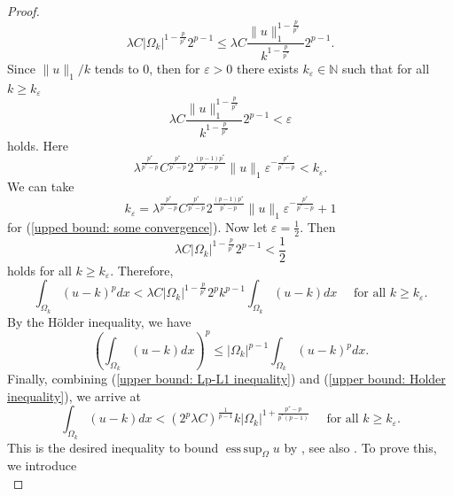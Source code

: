 \documentclass[a4paper,12pt,reqno]{amsart}
\renewcommand\eqref[1]{(\ref{#1})} %
\numberwithin{equation}{section}
\theoremstyle{plain}
\theoremstyle{definition}
\DeclareMathOperator*{\esssup}{ess\,sup}
\begin{document}
\begin{proof}
\begin{equation*}
\lambda C \left|\Omega_{k}\right|^{1-\frac{p}{p^{*}}} 2^{p-1} \leq  \lambda C \frac{\|u\|_{1}^{1-\frac{p}{p^{*}}}}{k^{1-\frac{p}{p^{*}}}}2^{p-1}.
\end{equation*}
Since $\|u\|_{1}/k$ tends to $0$, then  for $\varepsilon>0$ there exists $k_{\varepsilon}\in \mathbb{N}$ such that for all $k\geq k_{\varepsilon}$
\begin{equation}\label{upped bound: some convergence}
\lambda C \frac{\|u\|_{1}^{1-\frac{p}{p^{*}}}}{k^{1-\frac{p}{p^{*}}}}2^{p-1}  < \varepsilon
\end{equation}
holds. Here 
\begin{equation*}
 \lambda^{{\frac{p^{*}}{ p^{*}-p}}}C^{{\frac{p^{*}}{ p^{*}-p}}}2^{\frac{(p-1)p^{*}}{ p^{*}-p}}\|u\|_{1} \varepsilon^{-\frac{p^{*}}{ p^{*}-p}}< k_{\varepsilon}.
\end{equation*}
We can take 
$$k_{\varepsilon}= \lambda^{{\frac{p^{*}}{ p^{*}-p}}}C^{{\frac{p^{*}}{ p^{*}-p}}}2^{\frac{(p-1)p^{*}}{ p^{*}-p}} \|u\|_{1} \varepsilon^{-\frac{p^{*}}{ p^{*}-p}}+1$$ 
for \eqref{upped bound: some convergence}. Now let $\varepsilon=\frac{1}{2}$.  Then 
\begin{equation*}
 \lambda C \left|\Omega_{k}\right|^{1-\frac{p}{p^{*}}}2^{p-1} < \frac{1}{2}    
\end{equation*}
holds for all $k \geq k_{\varepsilon}$. Therefore,
\begin{equation}\label{upper bound: Lp-L1 inequality}
\int_{\Omega_{k}}(u-k)^{p} d x <\lambda C\left|\Omega_{k}\right|^{1-\frac{p}{p^{*}}}2^{p} k^{p-1}  \int_{\Omega_{k}}(u-k) d x  \quad \text{ for all } k \geq k_{\varepsilon}.
\end{equation}
By the H\"older inequality, we have
\begin{equation}\label{upper bound: Holder inequality}
\left(\int_{\Omega_{k}}(u-k) d x \right)^{p}\leq |\Omega_{k}|^{p-1}   \int_{\Omega_{k}}(u-k)^{p} d x.
\end{equation}
Finally, combining \eqref{upper bound: Lp-L1 inequality} and \eqref{upper bound: Holder inequality}, we arrive at
\begin{equation}\label{upper bound: desired inequality}
\int_{\Omega_{k}}(u-k) d x <  (2^{p}\lambda C)^{\frac{1}{p-1}} k\left|\Omega_{k}\right|^{1+\frac{p^{*}-p}{p^{*}(p-1)}} \quad \text{ for all } k \geq k_{\varepsilon}.  
\end{equation}
This is the desired inequality to bound $\esssup_{\Omega}u$ by  \cite[Lemma 5.1, p. 71]{Ladyzhenskaya1968}, see also \cite{Lin1992}. To prove this, we introduce
\begin{equation}\label{function f}

\end{equation}
\end{proof}
\end{document}

